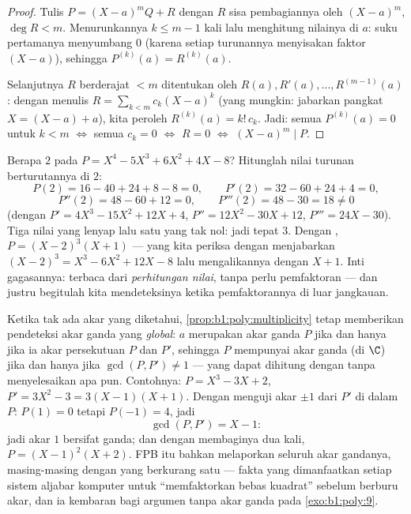 \begin{proof}
Tulis $P = (X - a)^m Q + R$ dengan $R$ sisa pembagiannya
oleh $(X-a)^m$, $\deg R < m$. Menurunkannya $k \leq m - 1$ kali lalu
menghitung nilainya di $a$: suku pertamanya menyumbang $0$ (karena setiap turunannya
menyisakan faktor $(X-a)$), sehingga $P^{(k)}(a) = R^{(k)}(a)$.

Selanjutnya  $R$ berderajat $< m$ ditentukan oleh $R(a), R'(a),
\dots, R^{(m-1)}(a)$: dengan menulis $R = \sum_{k < m} c_k (X - a)^k$
(yang mungkin: jabarkan pangkat $X = (X - a) + a$), kita peroleh
$R^{(k)}(a) = k!\, c_k$. Jadi: semua $P^{(k)}(a) = 0$ untuk $k < m$
$\iff$ semua $c_k = 0$ $\iff$ $R = 0$ $\iff$ $(X-a)^m \mid P$.
\end{proof}

\begin{example}\label{ex:b1:poly:multexample}
Berapa  $2$ pada $P = X^4 - 5X^3 + 6X^2
+ 4X - 8$? Hitunglah nilai turunan berturutannya di $2$:
\[
P(2) = 16 - 40 + 24 + 8 - 8 = 0, \qquad
P'(2) = 32 - 60 + 24 + 4 = 0,
\]
\[
P''(2) = 48 - 60 + 12 = 0, \qquad
P'''(2) = 48 - 30 = 18 \neq 0
\]
(dengan $P' = 4X^3 - 15X^2 + 12X + 4$, $P'' = 12X^2 - 30X + 12$,
$P''' = 24X - 30$). Tiga nilai yang lenyap lalu satu yang tak nol:
jadi  tepat $3$. Dengan , $P = (X - 2)^3(X + 1)$ ---
yang kita periksa dengan menjabarkan $(X-2)^3 = X^3 - 6X^2 + 12X - 8$ lalu
mengalikannya dengan $X + 1$. Inti gagasannya:  terbaca dari
\emph{perhitungan nilai}, tanpa perlu pemfaktoran --- dan justru begitulah
kita mendeteksinya ketika pemfaktorannya di luar jangkauan.
\end{example}

\begin{example}\label{ex:b1:poly:gcdmultiple}
Ketika tak ada akar yang diketahui, \cref{prop:b1:poly:multiplicity} tetap
memberikan pendeteksi akar ganda yang \emph{global}: $a$ merupakan akar
ganda $P$ jika dan hanya jika ia akar persekutuan $P$ dan $P'$, sehingga $P$ mempunyai
akar ganda (di $\C$) jika dan hanya jika $\gcd(P, P') \neq 1$ --- yang dapat dihitung dengan
 tanpa menyelesaikan apa pun. Contohnya: $P =
X^3 - 3X + 2$, $P' = 3X^2 - 3 = 3(X - 1)(X + 1)$. Dengan menguji
akar $\pm1$ dari $P'$ di dalam $P$: $P(1) = 0$ tetapi $P(-1) = 4$, jadi
\[
\gcd(P, P') = X - 1 :
\]
jadi akar $1$ bersifat ganda; dan dengan membaginya dua kali, $P = (X - 1)^2(X + 2)$.
FPB itu bahkan melaporkan seluruh  akar gandanya, masing-masing dengan
 yang berkurang satu --- fakta yang dimanfaatkan setiap sistem aljabar
komputer untuk ``memfaktorkan bebas kuadrat'' sebelum berburu
akar, dan ia kembaran  bagi
argumen tanpa akar ganda pada \cref{exo:b1:poly:9}.
\end{example}

